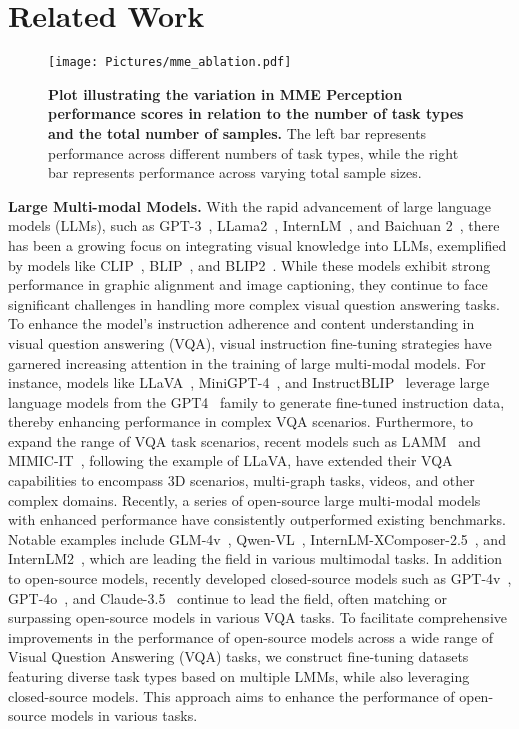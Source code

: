 \section{Related Work}
\begin{wrapfigure}{r}{0.4\textwidth}
    \centering
    \texttt{[image: Pictures/mme\_ablation.pdf]}
    \caption{\textbf{Plot illustrating the variation in MME Perception performance scores in relation to the number of task types and the total number of samples.} The left bar represents performance across different numbers of task types, while the right bar represents performance across varying total sample sizes.}
    \label{fig: ablation_study_mme}
\end{wrapfigure}
\textbf{Large Multi-modal Models.} 
With the rapid advancement of large language models (LLMs), such as GPT-3~\citep{gpt3}, LLama2~\citep{llama2}, InternLM~\citep{internlm}, and Baichuan 2~\citep{baichuan2}, there has been a growing focus on integrating visual knowledge into LLMs, exemplified by models like CLIP~\citep{clipvit}, BLIP~\citep{blip}, and BLIP2~\citep{blip2}. While these models exhibit strong performance in graphic alignment and image captioning, they continue to face significant challenges in handling more complex visual question answering tasks.
To enhance the model's instruction adherence and content understanding in visual question answering (VQA), visual instruction fine-tuning strategies have garnered increasing attention in the training of large multi-modal models. For instance, models like LLaVA~\citep{llava}, MiniGPT-4~\citep{minigpt}, and InstructBLIP~\citep{instructblip} leverage large language models from the GPT4~\citep{gpt4} family to generate fine-tuned instruction data, thereby enhancing performance in complex VQA scenarios. Furthermore, to expand the range of VQA task scenarios, recent models such as LAMM~\citep{lamm} and MIMIC-IT~\citep{mimic}, following the example of LLaVA, have extended their VQA capabilities to encompass 3D scenarios, multi-graph tasks, videos, and other complex domains. Recently, a series of open-source large multi-modal models  with enhanced performance have consistently outperformed existing benchmarks. Notable examples include GLM-4v~\citep{glm4v}, Qwen-VL~\citep{qwenvl}, InternLM-XComposer-2.5~\citep{internlm-xcomposer-2.5}, and InternLM2~\citep{internlm2_5}, which are leading the field in various multimodal tasks. In addition to open-source models, recently developed closed-source models such as GPT-4v~\citep{gpt4v}, GPT-4o~\citep{hurst2024gpt}, and Claude-3.5~\citep{claude3.5} continue to lead the field, often matching or surpassing open-source models in various VQA tasks. To facilitate comprehensive improvements in the performance of open-source models across a wide range of Visual Question Answering (VQA) tasks, we construct fine-tuning datasets featuring diverse task types based on multiple LMMs, while also leveraging closed-source models. This approach aims to enhance the performance of open-source models in various tasks.

